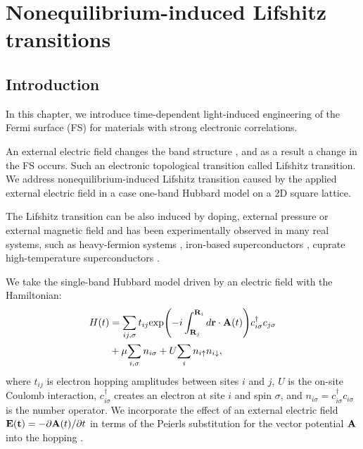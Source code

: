 \chapter{Nonequilibrium-induced Lifshitz transitions}
\label{chap:FS}

\section{Introduction}
In this chapter, we introduce time-dependent light-induced engineering of the Fermi surface (FS) for materials with strong electronic correlations. 

An external electric field changes the band structure \cite{Principi_2016}, and as a result a change in the FS occurs. Such an electronic topological transition called Lifshitz transition.
We address nonequilibrium-induced Lifshitz transition caused by the applied external electric field in a case one-band Hubbard model on a 2D square lattice.

The Lifshitz transition can be also induced by doping, external pressure or external magnetic field and has been experimentally observed in many real systems, such as heavy-fermion systems 
\cite{PhysRevB.86.075108, PhysRevLett.110.256403, PhysRevLett.116.037202}, 
iron-based superconductors \cite{PhysRevB.83.020501, PhysRevB.86.165117, PhysRevB.88.220508, PhysRevLett.112.156401, PhysRevB.90.224508, Liu_2010_FS}, 
cuprate high-temperature superconductors \cite{PhysRevB.81.180513, PhysRevB.83.054506, PhysRevLett.114.147001, PhysRevLett.120.067002, PhysRevB.81.121102}.





We take the single-band Hubbard model driven by an electric field with the Hamiltonian:
\begin{equation}
\begin{split}
H(t)&=\sum_{ij,\sigma}t_{ij}{\rm exp}{\left( -i\int_{{\bf R}_{j}}^{{\bf R}_{i}}d{\bf r} \cdot {\bf A}(t) \right)}c_{i \sigma}^{\dagger}c_{j \sigma}\\
&+\mu {\sum_{i,\sigma} n_{i \sigma}}+U{\sum_{i} n_{i \uparrow}n_{i \downarrow}},
\end{split}
\end{equation}
where $t_{ij}$ is electron hopping amplitudes between sites $i$ and $j$, $U$ is the on-site Coulomb interaction, $c_{i \sigma}^{\dagger}$ creates an electron at site $i$ and spin $\sigma$, and 
$n_{i\sigma}=c_{i\sigma}^{\dagger}c_{i\sigma}$ is the number operator. We incorporate the effect of 
an external electric field ${\bf E(t)} = -\partial{\bf A}(t)/\partial t$ in terms of the Peierls
substitution \cite{Peierls1933} for the vector potential ${\bf A}$ into the hopping \cite{PhysRevLett.106.236401, PhysRevB.91.245153}.  

